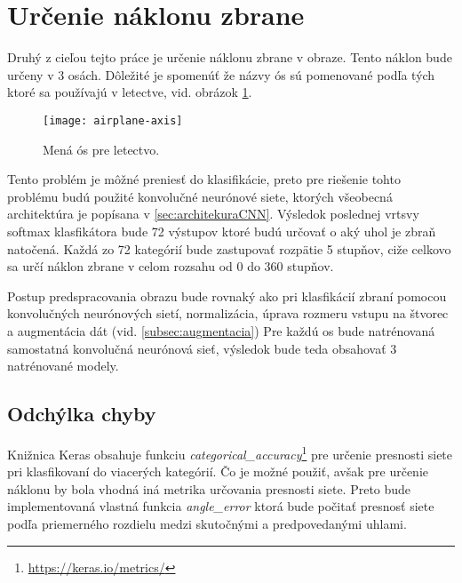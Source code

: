 
\section{Určenie náklonu zbrane}
\label{sec:urcenienaklonuzbrane}
Druhý z cieľou tejto práce je určenie náklonu zbrane v obraze.
Tento náklon bude určeny v 3 osách.
Dôležité je spomenúť že názvy ós sú pomenované podľa tých ktoré sa používajú v letectve, vid. obrázok \ref{pic:airplaneaxis}.
\begin{figure}[H]
    \centering
    \texttt{[image: airplane-axis]}
    \caption{Mená ós pre letectvo.}
    \label{pic:airplaneaxis}
\end{figure}

Tento problém je môžné preniesť do klasifikácie, preto pre riešenie tohto problému budú použité konvolučné neurónové siete, ktorých všeobecná architektúra je popísana v \ref{sec:architekuraCNN}.
Výsledok poslednej vrtsvy softmax klasfikátora bude 72 výstupov ktoré budú určovať o aký uhol je zbraň natočená.
Každá zo 72 kategórií bude zastupovať rozpätie 5 stupňov, ciže celkovo sa určí náklon zbrane v celom rozsahu od 0 do 360 stupňov.

Postup predspracovania obrazu bude rovnaký ako pri klasfikácií zbraní pomocou konvolučných neurónových sietí, normalizácia, úprava rozmeru vstupu na štvorec a augmentácia dát (vid. \ref{subsec:augmentacia})
Pre každú os bude natrénovaná samostatná konvolučná neurónová sieť, výsledok bude teda obsahovať 3 natrénované modely.

\subsection{Odchýlka chyby}
\label{subsec:odchylkachyby}
Knižnica Keras obsahuje funkciu \textit{categorical\_accuracy}\footnote{\url{https://keras.io/metrics/}} pre určenie presnosti siete pri klasfikovaní do viacerých kategórií.
Čo je možné použiť, avšak pre určenie náklonu by bola vhodná iná metrika určovania presnosti siete.
Preto bude implementovaná vlastná funkcia \textit{angle\_error} ktorá bude počitať presnosť siete podľa priemerného rozdielu medzi skutočnými a predpovedanými uhlami.
